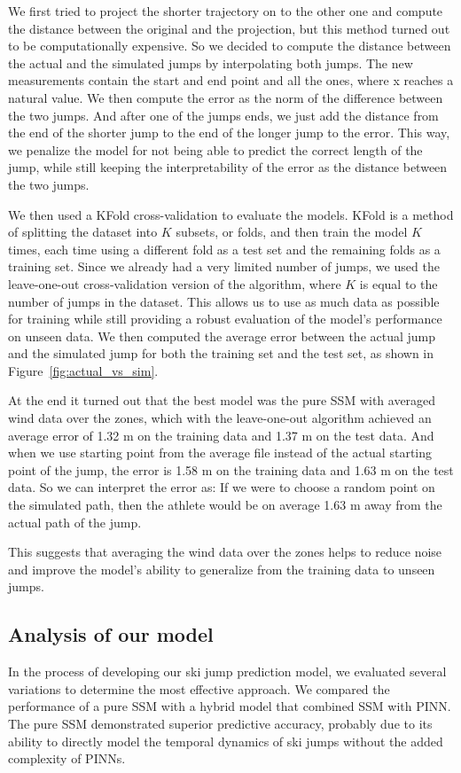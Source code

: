 \documentclass[sigconf]{acmart}
\begin{document}
We first tried to project the shorter trajectory on to the other one and
compute the distance between the original and the projection, but this method
turned out to be computationally expensive. So we decided to compute the
distance between the actual and the simulated jumps by interpolating both
jumps. The new measurements contain the start and end point and all the ones,
where x reaches a natural value. We then compute the error as the norm of the
difference between the two jumps. And after one of the jumps ends, we just add
the distance from the end of the shorter jump to the end of the longer jump to
the error. This way, we penalize the model for not being able to predict the
correct length of the jump, while still keeping the interpretability of the
error as the distance between the two jumps.

We then used a KFold cross-validation to evaluate the models. KFold is a method 
of splitting the dataset into $K$ subsets, or folds, and then train the model $K$ times,
each time using a different fold as a test set and the remaining folds as a training set.
Since we already had a very limited number of jumps, we used the leave-one-out 
cross-validation version of the algorithm, where $K$ is equal to the number of jumps 
in the dataset. This allows us to use as much data as possible for training while 
still providing a robust evaluation of the model's performance on unseen data.
We then computed the average error between the actual jump and the simulated jump 
for both the training set and the test set, as shown in Figure~\ref{fig:actual_vs_sim}. 

At the end it turned out that the best model was the pure SSM with averaged wind
data over the zones, which with the leave-one-out algorithm achieved an average 
error of 1.32 m on the training data and 1.37 m on the test data. And when we use
starting point from the average file instead of the actual starting point of the 
jump, the error is 1.58 m on the training data and 1.63 m on the test data.
So we can interpret the error as: If we were to choose a random point on the simulated
path, then the athlete would be on average 1.63 m away from the actual path of the jump.

This suggests that averaging the wind data over the zones helps to
reduce noise and improve the model's ability to generalize from the training data 
to unseen jumps.


\subsection{Analysis of our model}
In the process of developing our ski jump prediction model, we evaluated several
variations to determine the most effective approach. We compared the
performance of a pure SSM with a hybrid model that combined SSM with PINN. The
pure SSM demonstrated superior predictive accuracy, probably due to its ability
to directly model the temporal dynamics of ski jumps without the added
complexity of PINNs.
\end{document}
